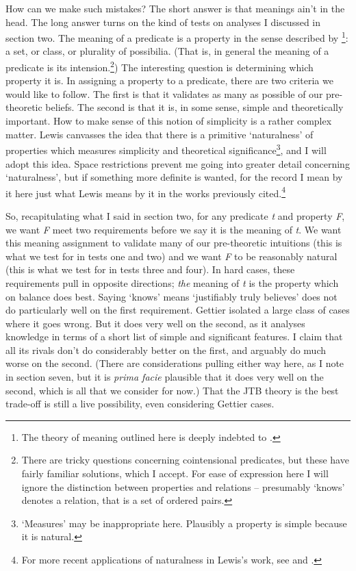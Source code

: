 How can we make such mistakes? The short answer is that meanings ain't in the head. The long answer turns on the kind of tests on analyses I discussed in section two. The meaning of a predicate is a property in the sense described by \citet{Lewis1983e}\footnote{The theory of meaning outlined here is deeply indebted to \citet{Lewis1983e, Lewis1984b, Lewis1992a}.}: a set, or class, or plurality of possibilia. (That is, in general the meaning of a predicate is its intension.\footnote{There are tricky questions concerning cointensional predicates, but these have fairly familiar solutions, which I accept. For ease of expression here I will ignore the distinction between properties and relations -- presumably `knows' denotes a relation, that is a set of ordered pairs.}) The interesting question is determining which property it is. In assigning a property to a predicate, there are two criteria we would like to follow. The first is that it validates as many as possible of our pre\nobreakdash-theoretic beliefs. The second is that it is, in some sense, simple and theoretically important. How to make sense of this notion of simplicity is a rather complex matter. Lewis canvasses the idea that there is a primitive `naturalness' of properties which measures simplicity and theoretical significance\footnote{`Measures' may be inappropriate here. Plausibly a property is simple because it is natural.}, and I will adopt this idea. Space restrictions prevent me going into greater detail concerning `naturalness', but if something more definite is wanted, for the record I mean by it here just what Lewis means by it in the works previously cited.\footnote{For more recent applications of naturalness in Lewis's work, see \citet{Lewis1998Langton, Lewis2001Langton}and \citet{Lewis2001b}.}

So, recapitulating what I said in section two, for any predicate \textit{t} and property \textit{F}, we want \textit{F} meet two requirements before we say it is the meaning of \textit{t}. We want this meaning assignment to validate many of our pre\nobreakdash-theoretic intuitions (this is what we test for in tests one and two) and we want \textit{F} to be reasonably natural (this is what we test for in tests three and four). In hard cases, these requirements pull in opposite directions; \textit{the }meaning of \textit{t} is the property which on balance does best. Saying `knows' means `justifiably truly believes' does not do particularly well on the first requirement. Gettier isolated a large class of cases where it goes wrong. But it does very well on the second, as it analyses knowledge in terms of a short list of simple and significant features. I claim that all its rivals don't do considerably better on the first, and arguably do much worse on the second. (There are considerations pulling either way here, as I note in section seven, but it is \textit{prima facie} plausible that it does very well on the second, which is all that we consider for now.) That the JTB theory is the best trade\nobreakdash-off is still a live possibility, even considering Gettier cases.

